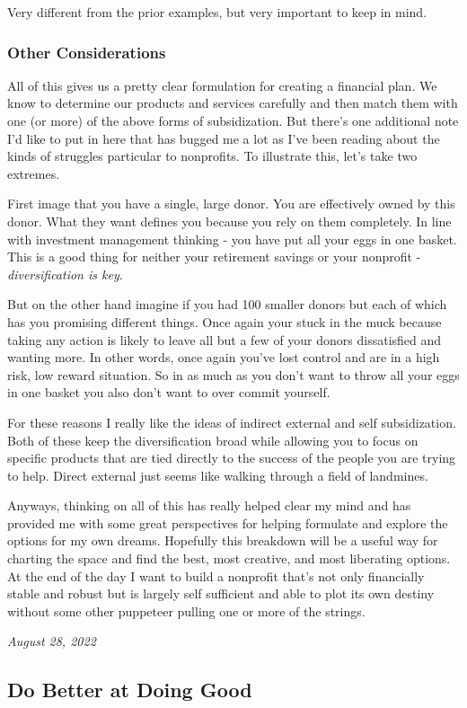 \documentclass[10pt,a5paper]{book}
\begin{document}
Very different from the prior examples, but very important to keep in mind. 

\subsubsection{Other Considerations}
All of this gives us a pretty clear formulation for creating a financial plan. We know to determine our products and services carefully and then match them with one (or more) of the above forms of subsidization. But there's one additional note I'd like to put in here that has bugged me a lot as I've been reading about the kinds of struggles particular to nonprofits. To illustrate this, let's take two extremes. 

First image that you have a single, large donor. You are effectively owned by this donor. What they want defines you because you rely on them completely. In line with investment management thinking - you have put all your eggs in one basket. This is a good thing for neither your retirement savings or your nonprofit - \textit{diversification is key}. 

But on the other hand imagine if you had 100 smaller donors but each of which has you promising different things. Once again your stuck in the muck because taking any action is likely to leave all but a few of your donors dissatisfied and wanting more. In other words, once again you've lost control and are in a high risk, low reward situation. So in as much as you don't want to throw all your eggs in one basket you also don't want to over commit yourself. 

For these reasons I really like the ideas of indirect external and self subsidization. Both of these keep the diversification broad while allowing you to focus on specific products that are tied directly to the success of the people you are trying to help. Direct external just seems like walking through a field of landmines. \linebreak

Anyways, thinking on all of this has really helped clear my mind and has provided me with some great perspectives for helping formulate and explore the options for my own dreams. Hopefully this breakdown will be a useful way for charting the space and find the best, most creative, and most liberating options. At the end of the day I want to build a nonprofit that's not only financially stable and robust but is largely self sufficient and able to plot its own destiny without some other puppeteer pulling one or more of the strings. 

\textit{August 28, 2022}

\subsection{Do Better at Doing Good}
\end{document}
